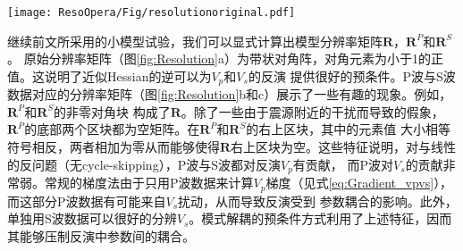 \begin{figure*}
    \begin{center}
        \texttt{[image: ResoOpera/Fig/resolutionoriginal.pdf]}
        \caption{
Resolution matrix and its components:
(a) $\mathbf{R}$, (b) $\mathbf{R}^P$ and (c) $\mathbf{R}^S$.
    }
    \label{fig:Resolution}
    \end{center}
\end{figure*}
继续前文所采用的小模型试验，我们可以显式计算出模型分辨率矩阵$\mathbf{R}$，$\mathbf{R}^P$和$\mathbf{R}^S$。
原始分辨率矩阵（图\ref{fig:Resolution}a）为带状对角阵，对角元素为小于1的正值。这说明了近似Hessian的逆可以为$V_p$和$V_s$的反演
提供很好的预条件。P波与S波数据对应的分辨率矩阵（图\ref{fig:Resolution}b和c）展示了一些有趣的现象。例如，$\mathbf{R}^P$和$\mathbf{R}^S$的非零对角块
构成了$\mathbf{R}$。除了一些由于震源附近的干扰而导致的假象，$\mathbf{R}^P$的底部两个区块都为空矩阵。在$\mathbf{R}^P$和$\mathbf{R}^S$的右上区块，其中的元素值
大小相等符号相反，两者相加为零从而能够使得$\mathbf{R}$右上区块为空。这些特征说明，对与线性的反问题（无cycle-skipping），P波与S波都对反演$V_p$有贡献，
而P波对$V_s$的贡献非常弱。常规的梯度法由于只用P波数据来计算$V_p$梯度（见式\ref{eq:Gradient_vpvs}），而这部分P波数据有可能来自$V_s$扰动，从而导致反演受到
参数耦合的影响。此外，单独用S波数据可以很好的分辨$V_s$。模式解耦的预条件方式利用了上述特征，因而其能够压制反演中参数间的耦合。
